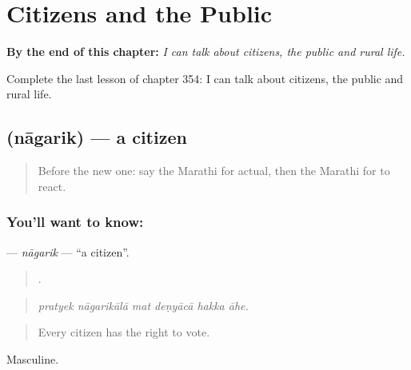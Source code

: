 
\chapter{Citizens and the Public}
\label{ch:mr-citizens-and-the-public}

\begin{chapteropening}
\textbf{By the end of this chapter:} \emph{I can talk about citizens, the public and rural life.}

Complete the last lesson of chapter 354: I can talk about citizens, the public and rural life.
\end{chapteropening}

\section[\texorpdfstring{\mr{नागरिक} (nāgarik)}{नागरिक (nāgarik)}]{ (nāgarik) — a citizen}

\label{lesson:MR-C354-nagarik}



\begin{quote}
Before the new one: say the Marathi for actual, then the Marathi for to react.
\end{quote}

\subsection*{You'll want to know: }
\textbf{} — \emph{nāgarik} — \textquotedblleft{}a citizen\textquotedblright{}.

\begin{quote}
     .
\end{quote}

\begin{quote}
\emph{pratyek nāgarikālā mat deṇyācā hakka āhe.}
\end{quote}

\begin{quote}
Every citizen has the right to vote.
\end{quote}

Masculine.

